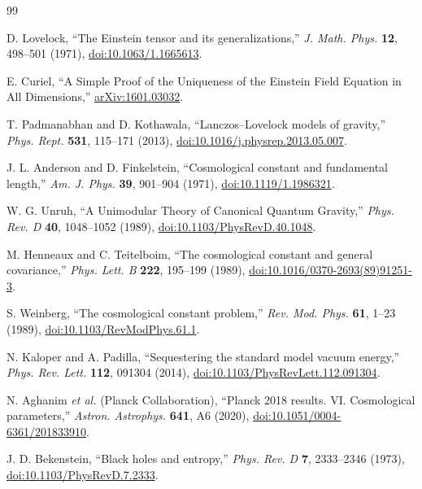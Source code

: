 \documentclass[aps,prd,reprint,nofootinbib,superscriptaddress,floatfix]{revtex4-2}
\numberwithin{equation}{section}
\theoremstyle{definition}
\theoremstyle{plain}
\begin{document}
\begin{thebibliography}{99}

D. Lovelock,
``The Einstein tensor and its generalizations,''
\emph{J. Math. Phys.} \textbf{12}, 498--501 (1971),
\href{https://doi.org/10.1063/1.1665613}{doi:10.1063/1.1665613}.

E. Curiel,
``A Simple Proof of the Uniqueness of the Einstein Field Equation in All Dimensions,''
\href{https://arxiv.org/abs/1601.03032}{arXiv:1601.03032}.

T. Padmanabhan and D. Kothawala,
``Lanczos--Lovelock models of gravity,''
\emph{Phys. Rept.} \textbf{531}, 115--171 (2013),
\href{https://doi.org/10.1016/j.physrep.2013.05.007}{doi:10.1016/j.physrep.2013.05.007}.

J. L. Anderson and D. Finkelstein,
``Cosmological constant and fundamental length,''
\emph{Am. J. Phys.} \textbf{39}, 901--904 (1971),
\href{https://doi.org/10.1119/1.1986321}{doi:10.1119/1.1986321}.

W. G. Unruh,
``A Unimodular Theory of Canonical Quantum Gravity,''
\emph{Phys. Rev. D} \textbf{40}, 1048--1052 (1989),
\href{https://doi.org/10.1103/PhysRevD.40.1048}{doi:10.1103/PhysRevD.40.1048}.

M. Henneaux and C. Teitelboim,
``The cosmological constant and general covariance,''
\emph{Phys. Lett. B} \textbf{222}, 195--199 (1989),
\href{https://doi.org/10.1016/0370-2693(89)91251-3}{doi:10.1016/0370-2693(89)91251-3}.

S. Weinberg,
``The cosmological constant problem,''
\emph{Rev. Mod. Phys.} \textbf{61}, 1--23 (1989),
\href{https://doi.org/10.1103/RevModPhys.61.1}{doi:10.1103/RevModPhys.61.1}.


N. Kaloper and A. Padilla,
``Sequestering the standard model vacuum energy,''
\emph{Phys. Rev. Lett.} \textbf{112}, 091304 (2014),
\href{https://doi.org/10.1103/PhysRevLett.112.091304}{doi:10.1103/PhysRevLett.112.091304}.

N. Aghanim \emph{et al.} (Planck Collaboration),
``Planck 2018 results. VI. Cosmological parameters,''
\emph{Astron. Astrophys.} \textbf{641}, A6 (2020),
\href{https://doi.org/10.1051/0004-6361/201833910}{doi:10.1051/0004-6361/201833910}.

J. D. Bekenstein,
``Black holes and entropy,''
\emph{Phys. Rev. D} \textbf{7}, 2333--2346 (1973),
\href{https://doi.org/10.1103/PhysRevD.7.2333}{doi:10.1103/PhysRevD.7.2333}.


\end{thebibliography}
\end{document}
